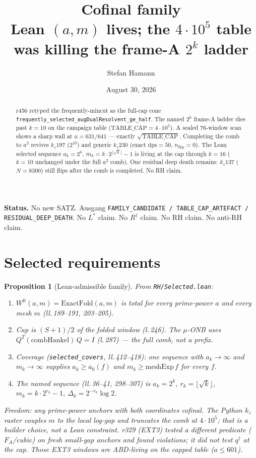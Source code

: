 \documentclass[11pt]{article}
\title{\bfseries Cofinal family\\[2mm]
\large Lean $(a,m)$ lives; the $4\cdot10^5$ table\\
was killing the frame-A $2^k$ ladder}
\author{Stefan Hamann}
\date{August 30, 2026}
\newtheorem{prop}{Proposition}
\begin{document}
\maketitle

\begin{abstract}\noindent
r456 retyped the frequently-mincut as the
full-cap cone
\texttt{frequently\_selected\_augDualResolvent\_ge\_half}.
The named $2^k$ frame-A ladder dies past $k=10$
on the campaign table ($\mathrm{TABLE\_CAP}=4\cdot10^5$).
A sealed 76-window scan shows a sharp wall at
$a=631/641$ --- exactly
$\sqrt{\mathrm{TABLE\_CAP}}$.
Completing the comb to $a^2$ revives
$k_z197$ ($2^{10}$) and generic $k_z230$
(exact $\mathrm{dps}=50$, $n_{\mathrm{flip}}=0$).
The Lean selected sequence
$a_k=2^k$, $m_k=k\cdot 2^{\lfloor\sqrt k\rfloor}-1$
is living at the cap through $k=16$
($k=10$ unchanged under the full $a^2$ comb).
One residual deep death remains:
$k_z137$ ($N=8300$) still flips after the comb
is completed.  No RH claim.
\end{abstract}

\medskip\noindent
\textbf{Status.}\enspace
No new SATZ.
Ausgang
\texttt{FAMILY\_CANDIDATE / TABLE\_CAP\_ARTEFACT / RESIDUAL\_DEEP\_DEATH}.
No $L^{*}$ claim.  No $R^{\dagger}$ claim.
No RH claim.  No anti-RH claim.

\section{Selected requirements}\label{sec:A}

\begin{prop}[Lean-admissible family]\label{prop:lean}
From \texttt{RH/Selected.lean}:
\begin{enumerate}
\item $W^{\mathbb{R}}(a,m)=\mathrm{ExactFold}(a,m)$
is total for every prime-power $a$ and every mesh
$m$ (ll.\,189--191, 203--205).
\item Cap is $(S+1)/2$ of the folded window
(l.\,246).  The $\mu$-ONB uses
$Q^{T}(\mathrm{combHankel})\,Q=I$ (l.\,287) ---
the full comb, not a prefix.
\item Coverage
(\texttt{selected\_covers}, ll.\,412--418):
one sequence with $a_k\to\infty$ and
$m_k\to\infty$ supplies
$a_k\ge a_0(f)$ and $m_k\ge\mathrm{meshExp}\,f$
for every $f$.
\item The named sequence (ll.\,36--41, 298--307)
is $a_k=2^k$, $r_k=\lfloor\sqrt k\rfloor$,
$m_k=k\cdot 2^{r_k}-1$,
$\Delta_k=2^{-r_k}\log 2$.
\end{enumerate}
Freedom: any prime-power anchors with both
coordinates cofinal.  The Python $k_z$ raster
couples $m$ to the local log-gap and truncates
the comb at $4\cdot10^5$; that is a builder
choice, not a Lean constraint.
r329 (EXT3) tested a different predicate
($F_A$/cubic) on fresh small-gap anchors and
found violations; it did not test $q^{\dagger}$
at the cap.  Those EXT3 windows are
ABD-living on the capped table ($a\le 601$).
\end{prop}
\end{document}
